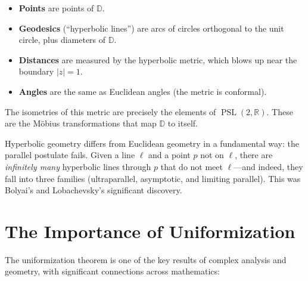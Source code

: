 \begin{itemize}
    \item \textbf{Points} are points of $\mathbb{D}$.
    \item \textbf{Geodesics} (``hyperbolic lines'') are arcs of circles orthogonal to the unit circle, plus diameters of $\mathbb{D}$.
    \item \textbf{Distances} are measured by the hyperbolic metric, which blows up near the boundary $|z|=1$.
    \item \textbf{Angles} are the same as Euclidean angles (the metric is conformal).
\end{itemize}

The isometries of this metric are precisely the elements of $\operatorname{PSL}(2,\mathbb{R})$. These are the M\"obius transformations that map $\mathbb{D}$ to itself.

\begin{remark}
Hyperbolic geometry differs from Euclidean geometry in a fundamental way: the parallel postulate fails. Given a line $\ell$ and a point $p$ not on $\ell$, there are \emph{infinitely many} hyperbolic lines through $p$ that do not meet $\ell$---and indeed, they fall into three families (ultraparallel, asymptotic, and limiting parallel). This was Bolyai's and Lobachevsky's significant discovery.
\end{remark}

\section{The Importance of Uniformization}

The uniformization theorem is one of the key results of complex analysis and geometry, with significant connections across mathematics:


